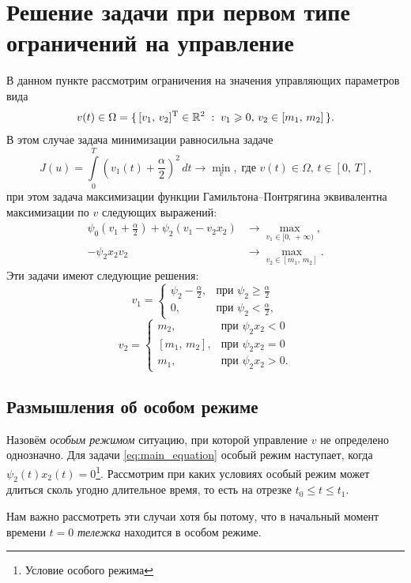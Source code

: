 \section{Решение задачи при первом типе ограничений на управление}

В данном пункте рассмотрим ограничения на значения управляющих параметров вида
$$
        v(t) \in \Omega = \{\,[v_1,\,v_2]^{\mathrm{T}}\in\mathbb{R}^2\;:\;v_1\geqslant 0,\,v_2 \in [m_1,\,m_2]\,\}.
$$
В этом случае задача минимизации равносильна задаче
$$
        J(u) = \int\limits_0^T \left( v_1(t) + \frac{\alpha}{2}\right)^2\,dt \rightarrow \min\limits_{v},\;\mbox{где $v(t) \in \Omega$, $t\in[0,\,T]$,}
$$
при этом задача максимизации функции Гамильтона--Понтрягина эквивалентна максимизации по $v$ следующих выражений:
$$
        \begin{aligned}
        \psi_0\left(v_1+\frac{\alpha}{2}\right) + \psi_2(v_1 - v_2x_2) &\rightarrow \max\limits_{v_1\in [0,\,+\infty)},\\
        -\psi_2x_2v_2&\rightarrow \max\limits_{v_2\in[m_1,\,m_2]}.
        \end{aligned}
$$
Эти задачи имеют следующие решения:
\begin{equation}\label{eq:firstlim_u_1}
        v_1 = 
        \begin{cases}
                \psi_2 - \frac{\alpha}{2}, &\mbox{при $\psi_2 \geqslant \frac{\alpha}{2}$} \\
                0, & \mbox{при $\psi_2 < \frac{\alpha}{2}$},
        \end{cases}
\end{equation}
\begin{equation}\label{eq:firstlim_u_2}
        v_2 = 
        \begin{cases}
                m_2, &\mbox{при $\psi_2x_2<0$} \\
                [m_1,\,m_2], & \mbox{при $\psi_2x_2 = 0$} \\
                m_1, & \mbox{при $\psi_2x_2 > 0$}.
        \end{cases}
\end{equation}

\subsection{Размышления об особом режиме}

Назовём \textit{особым режимом} ситуацию, при которой управление $v$ не определено однозначно. Для задачи \eqref{eq:main_equation} особый режим наступает, когда $\psi_2(t)x_2(t) = 0$\footnote{Условие особого режима}. Рассмотрим при каких условиях особый режим может длиться сколь угодно длительное время, то есть на отрезке $t_0 \leqslant t \leqslant t_1$.
\begin{remark}
        Нам важно рассмотреть эти случаи хотя бы потому, что в начальный момент времени $t = 0$ \textit{тележка} находится в особом режиме.
\end{remark}

